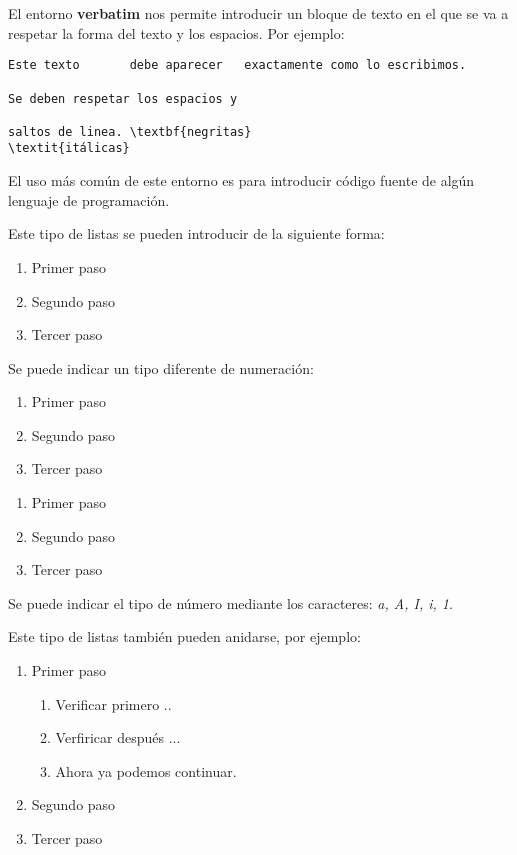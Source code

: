 \documentclass[letterpaper,11pt]{article}
\begin{document}
El entorno \textbf{verbatim} nos permite introducir un bloque de texto en el que se va a respetar la forma del texto y los espacios. Por ejemplo:

\begin{verbatim}
Este texto       debe aparecer   exactamente como lo escribimos.

Se deben respetar los espacios y

saltos de linea. \textbf{negritas} 
\textit{itálicas}
\end{verbatim}

El uso más común de este entorno es para introducir código fuente de algún lenguaje de programación.


Este tipo de listas se pueden introducir de la siguiente forma:

\begin{enumerate}
	\item Primer paso
	\item Segundo paso
	\item Tercer paso
\end{enumerate}

Se puede indicar un tipo diferente de numeración:

\begin{enumerate}[I]
	\item Primer paso
	\item Segundo paso
	\item Tercer paso
\end{enumerate}

\bigskip

\begin{enumerate}[a]
	\item Primer paso
	\item Segundo paso
	\item Tercer paso
\end{enumerate}

Se puede indicar el tipo de número mediante los caracteres: \textit{a, A, I, i, 1}.

Este tipo de listas también pueden anidarse, por ejemplo:

\begin{enumerate}
	\item Primer paso
		\begin{enumerate}
			\item Verificar primero ..
			\item Verfiricar después ...
			\item Ahora ya podemos continuar.
		\end{enumerate}
	\item Segundo paso
	\item Tercer paso
\end{enumerate}
\end{document}
